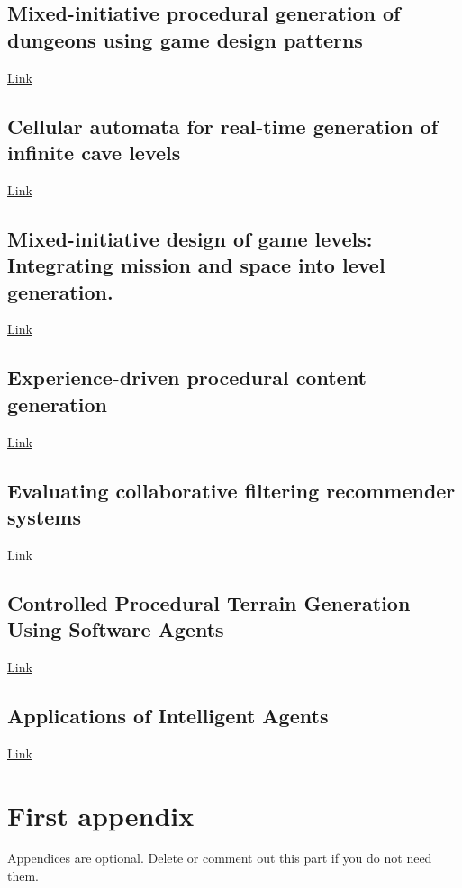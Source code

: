 \documentclass[journal]{IEEEtran}
\begin{document}
\subsection{Mixed-initiative procedural generation of dungeons using game design patterns\cite{baldwin2017mixed}}
\href{https://muep.mau.se/bitstream/handle/2043/22832/baldwin-holmberg_mixed-initiative-procedural_FINAL.pdf?sequence=2&isAllowed=y}{Link}

\subsection{Cellular automata for real-time generation of infinite cave levels\cite{johnson2010cellular}}
\href{https://dl-acm-org.ezproxy.falmouth.ac.uk/citation.cfm?id=1814266}{Link}
\subsection{Mixed-initiative  design  of game levels: Integrating mission and space into level generation.\cite{karavolos2015mixed}}
\href{http://www.fdg2015.org/papers/fdg2015_paper_25.pdf}{Link}

\subsection{Experience-driven procedural content generation\cite{yannakakis2011experience}}
\href{https://ieeexplore-ieee-org.ezproxy.falmouth.ac.uk/document/5740836}{Link}
\subsection{Evaluating collaborative filtering recommender systems\cite{herlocker2004evaluating}}
\href{https://dl-acm-org.ezproxy.falmouth.ac.uk/ft_gateway.cfm?id=963772&ftid=247769&dwn=1&CFID=19451816&CFTOKEN=60d77465fa35c5bb-88408FAD-D71F-E81D-FF436ADBE71D45CA}{Link}

\subsection{Controlled Procedural Terrain Generation Using Software Agents\cite{doran2010controlled}}
\href{https://ieeexplore-ieee-org.ezproxy.falmouth.ac.uk/document/5454273}{Link}

\subsection{Applications of Intelligent Agents\cite{jennings1998applications}}
\href{ftp://143.106.148.79/pub/docs/gudwin/ia009/jennings98applications.pdf}{Link}





\appendices
\section{First appendix}
Appendices are optional. Delete or comment out this part if you do not need them.

\end{document}
